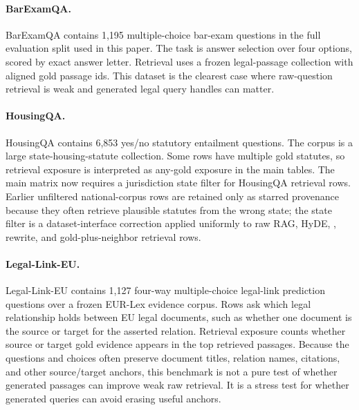 

\paragraph{BarExamQA.}
BarExamQA contains 1,195 multiple-choice bar-exam questions in the full
evaluation split used in this paper. The task is answer selection over four options, scored by exact answer
letter. Retrieval uses a frozen legal-passage collection with aligned gold
passage ids. This dataset is the clearest case where raw-question retrieval is
weak and generated legal query handles can matter.

\paragraph{HousingQA.}
HousingQA contains 6,853 yes/no statutory entailment questions. The corpus is a
large state-housing-statute collection. Some rows have multiple gold statutes,
so retrieval exposure is interpreted as any-gold exposure in the main tables.
The main matrix now requires a jurisdiction state filter for HousingQA retrieval
rows. Earlier unfiltered national-corpus rows are retained only as starred
provenance because they often retrieve plausible statutes from the wrong state;
the state filter is a dataset-interface correction applied uniformly to raw
RAG, HyDE, \hyre{}, rewrite, and gold-plus-neighbor retrieval rows.

\paragraph{Legal-Link-EU.}
Legal-Link-EU contains 1,127 four-way multiple-choice legal-link prediction
questions over a frozen EUR-Lex evidence corpus. Rows ask which legal
relationship holds between EU legal documents, such as whether one document is
the source or target for the asserted relation. Retrieval exposure counts
whether source or target gold evidence appears in the top retrieved passages.
Because the questions and choices often preserve document titles, relation
names, citations, and other source/target anchors, this benchmark is not a pure
test of whether generated passages can improve weak raw retrieval. It is a
stress test for whether generated queries can avoid erasing useful anchors.

